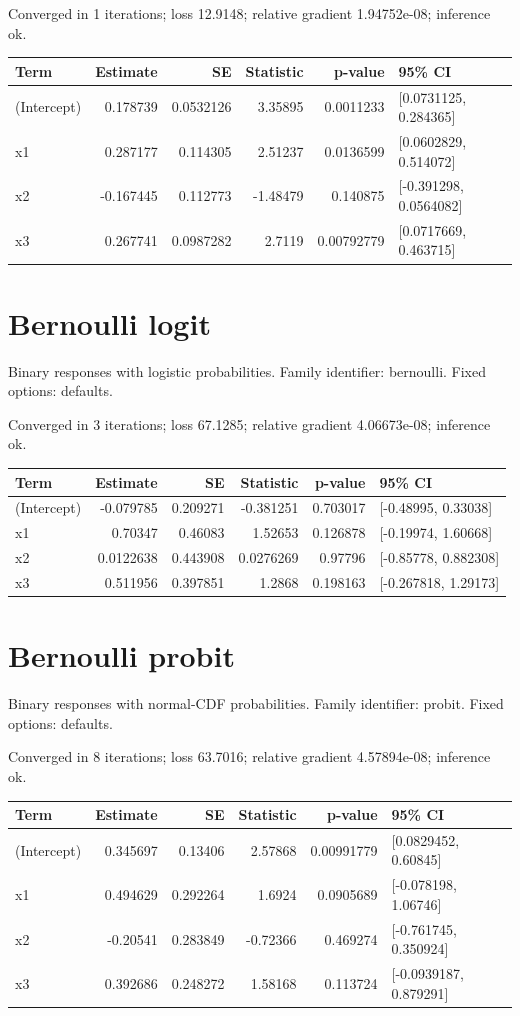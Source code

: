 \documentclass[11pt]{article}
\begin{document}
Converged in 1 iterations; loss 12.9148; relative gradient 1.94752e-08; inference ok.
\begin{center}\small\begin{tabular}{lrrrrl}\toprule
Term & Estimate & SE & Statistic & p-value & 95\% CI \\ \midrule
(Intercept) & 0.178739 & 0.0532126 & 3.35895 & 0.0011233 & [0.0731125, 0.284365] \\
x1 & 0.287177 & 0.114305 & 2.51237 & 0.0136599 & [0.0602829, 0.514072] \\
x2 & -0.167445 & 0.112773 & -1.48479 & 0.140875 & [-0.391298, 0.0564082] \\
x3 & 0.267741 & 0.0987282 & 2.7119 & 0.00792779 & [0.0717669, 0.463715] \\
\bottomrule\end{tabular}\end{center}
\section{Bernoulli logit}
Binary responses with logistic probabilities. Family identifier: bernoulli. Fixed options: defaults.

Converged in 3 iterations; loss 67.1285; relative gradient 4.06673e-08; inference ok.
\begin{center}\small\begin{tabular}{lrrrrl}\toprule
Term & Estimate & SE & Statistic & p-value & 95\% CI \\ \midrule
(Intercept) & -0.079785 & 0.209271 & -0.381251 & 0.703017 & [-0.48995, 0.33038] \\
x1 & 0.70347 & 0.46083 & 1.52653 & 0.126878 & [-0.19974, 1.60668] \\
x2 & 0.0122638 & 0.443908 & 0.0276269 & 0.97796 & [-0.85778, 0.882308] \\
x3 & 0.511956 & 0.397851 & 1.2868 & 0.198163 & [-0.267818, 1.29173] \\
\bottomrule\end{tabular}\end{center}
\section{Bernoulli probit}
Binary responses with normal-CDF probabilities. Family identifier: probit. Fixed options: defaults.

Converged in 8 iterations; loss 63.7016; relative gradient 4.57894e-08; inference ok.
\begin{center}\small\begin{tabular}{lrrrrl}\toprule
Term & Estimate & SE & Statistic & p-value & 95\% CI \\ \midrule
(Intercept) & 0.345697 & 0.13406 & 2.57868 & 0.00991779 & [0.0829452, 0.60845] \\
x1 & 0.494629 & 0.292264 & 1.6924 & 0.0905689 & [-0.078198, 1.06746] \\
x2 & -0.20541 & 0.283849 & -0.72366 & 0.469274 & [-0.761745, 0.350924] \\
x3 & 0.392686 & 0.248272 & 1.58168 & 0.113724 & [-0.0939187, 0.879291] \\
\bottomrule\end{tabular}\end{center}
\end{document}
